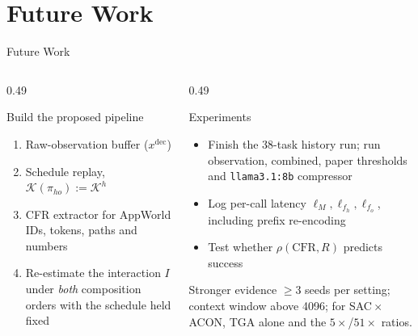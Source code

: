 \documentclass[aspectratio=169,10pt]{beamer}
\begin{document}
\section{Future Work}
\begin{frame}{Future Work}
\begin{columns}[T]
\begin{column}{0.49\textwidth}
\begin{block}{Build the proposed pipeline}
\footnotesize
\begin{enumerate}
  \item Raw-observation buffer ($x^{\mathrm{dec}}$)
  \item Schedule replay, $\mathcal{K}(\pi_{ho}):=\mathcal{K}^{h}$
  \item CFR extractor for AppWorld IDs, tokens, paths and numbers
  \item Re-estimate the interaction $I$ under \emph{both} composition orders
        with the schedule held fixed
\end{enumerate}
\end{block}
\end{column}
\begin{column}{0.49\textwidth}
\begin{block}{Experiments}
\footnotesize
\begin{itemize}
  \item Finish the 38-task history run; run observation, combined, paper
        thresholds and \texttt{llama3.1:8b} compressor
  \item Log per-call latency $\ell_M,\ell_{f_h},\ell_{f_o}$, including
        prefix re-encoding
  \item Test whether $\rho(\mathrm{CFR},R)$ predicts success
\end{itemize}
\end{block}
\begin{alertblock}{Stronger evidence}
\footnotesize
$\ge$3 seeds per setting; context window above 4096; for SAC\,$\times$\,ACON,
TGA alone and the $5\times$/$51\times$ ratios.
\end{alertblock}
\end{column}
\end{columns}
\end{frame}

\end{document}
